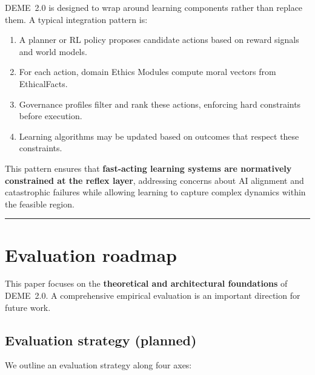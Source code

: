 \documentclass[11pt]{article}
\begin{document}
DEME~2.0 is designed to wrap around learning components rather than replace them. A typical integration pattern is:

\begin{enumerate}
  \item A planner or RL policy proposes candidate actions based on reward signals and world models.
  \item For each action, domain Ethics Modules compute moral vectors from EthicalFacts.
  \item Governance profiles filter and rank these actions, enforcing hard constraints before execution.
  \item Learning algorithms may be updated based on outcomes that respect these constraints.
\end{enumerate}

This pattern ensures that \textbf{fast-acting learning systems are normatively constrained at the reflex layer}, addressing concerns about AI alignment and catastrophic failures while allowing learning to capture complex dynamics within the feasible region.

\hrule
\vspace{1em}

\section{Evaluation roadmap}

This paper focuses on the \textbf{theoretical and architectural foundations} of DEME~2.0. A comprehensive empirical evaluation is an important direction for future work.

\subsection{Evaluation strategy (planned)}

We outline an evaluation strategy along four axes:
\end{document}
